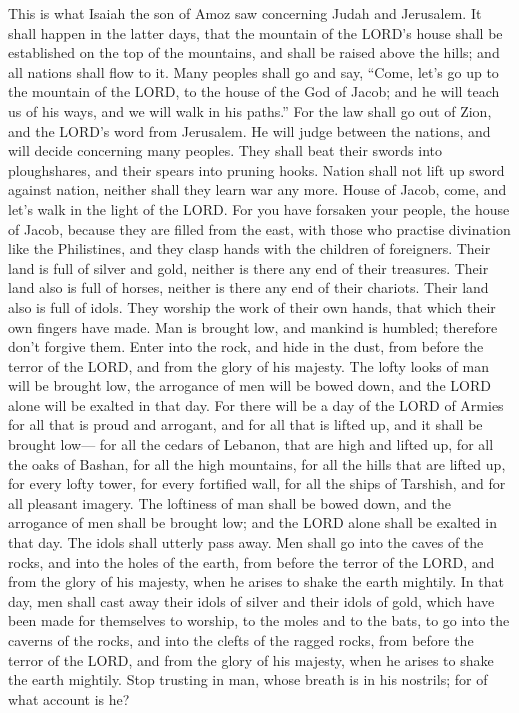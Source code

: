 This is what Isaiah the son of Amoz saw concerning Judah
and Jerusalem.  It shall happen in the latter days, that the
mountain of the LORD's house shall be established on the top of the
mountains, and shall be raised above the hills; and all nations shall
flow to it.  Many peoples shall go and say, ``Come, let's go
up to the mountain of the LORD, to the house of the God of Jacob; and he
will teach us of his ways, and we will walk in his paths.'' For the law
shall go out of Zion, and the LORD's word from Jerusalem. 
He will judge between the nations, and will decide concerning many
peoples. They shall beat their swords into ploughshares, and their
spears into pruning hooks. Nation shall not lift up sword against
nation, neither shall they learn war any more.  House of
Jacob, come, and let's walk in the light of the LORD.  For
you have forsaken your people, the house of Jacob, because they are
filled from the east, with those who practise divination like the
Philistines, and they clasp hands with the children of foreigners.
 Their land is full of silver and gold, neither is there any
end of their treasures. Their land also is full of horses, neither is
there any end of their chariots.  Their land also is full of
idols. They worship the work of their own hands, that which their own
fingers have made.  Man is brought low, and mankind is
humbled; therefore don't forgive them.  Enter into the
rock, and hide in the dust, from before the terror of the LORD, and from
the glory of his majesty.  The lofty looks of man will be
brought low, the arrogance of men will be bowed down, and the LORD alone
will be exalted in that day.  For there will be a day of
the LORD of Armies for all that is proud and arrogant, and for all that
is lifted up, and it shall be brought low---  for all the
cedars of Lebanon, that are high and lifted up, for all the oaks of
Bashan,  for all the high mountains, for all the hills that
are lifted up,  for every lofty tower, for every fortified
wall,  for all the ships of Tarshish, and for all pleasant
imagery.  The loftiness of man shall be bowed down, and the
arrogance of men shall be brought low; and the LORD alone shall be
exalted in that day.  The idols shall utterly pass away.
 Men shall go into the caves of the rocks, and into the
holes of the earth, from before the terror of the LORD, and from the
glory of his majesty, when he arises to shake the earth mightily.
 In that day, men shall cast away their idols of silver and
their idols of gold, which have been made for themselves to worship, to
the moles and to the bats,  to go into the caverns of the
rocks, and into the clefts of the ragged rocks, from before the terror
of the LORD, and from the glory of his majesty, when he arises to shake
the earth mightily.  Stop trusting in man, whose breath is
in his nostrils; for of what account is he?

